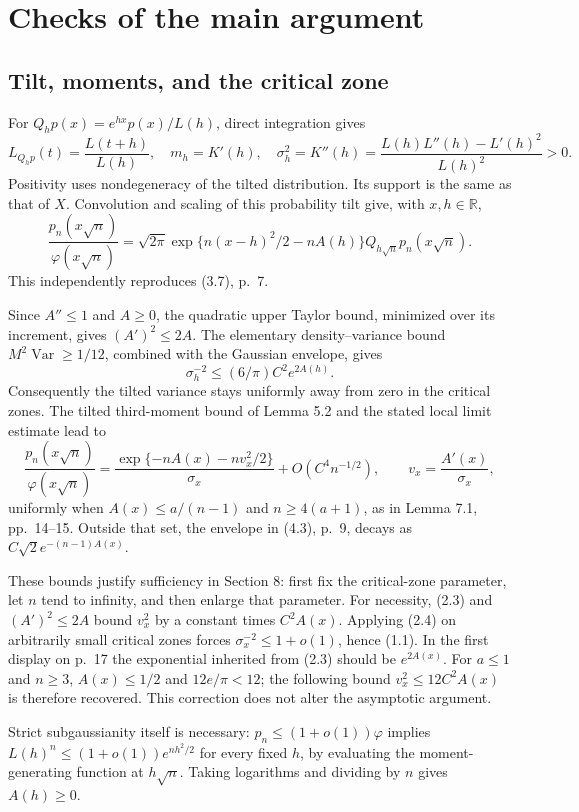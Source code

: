 \documentclass[10pt]{article}
\begin{document}
\section*{Checks of the main argument}
\subsection*{Tilt, moments, and the critical zone}
For \(Q_hp(x)=e^{hx}p(x)/L(h)\), direct integration gives \[L_{Q_hp}(t)=\frac{L(t+h)}{L(h)},\quad
 m_h=K'(h),\quad
 \sigma_h^2=K''(h)=\frac{L(h)L''(h)-L'(h)^2}{L(h)^2}>0.       \tag{2.1}\] Positivity uses nondegeneracy of the tilted distribution. Its support is the same as that of \(X\). Convolution and scaling of this probability tilt give, with \(x,h\in\mathbb R\), \[\frac{p_n(x\sqrt n)}{\varphi(x\sqrt n)}
 =\sqrt{2\pi}\exp\{n(x-h)^2/2-nA(h)\}
     Q_{h\sqrt n}p_n(x\sqrt n).                            \tag{2.2}\] This independently reproduces (3.7), p. 7.\par
Since \(A''\le1\) and \(A\ge0\), the quadratic upper Taylor bound, minimized over its increment, gives \((A')^2\le2A\). The elementary density–variance bound \(M^2\operatorname{Var}\ge1/12\), combined with the Gaussian envelope, gives \[\sigma_h^{-2}\le(6/\pi)C^2e^{2A(h)}.                       \tag{2.3}\] Consequently the tilted variance stays uniformly away from zero in the critical zones. The tilted third-moment bound of Lemma 5.2 and the stated local limit estimate lead to \[\frac{p_n(x\sqrt n)}{\varphi(x\sqrt n)}
 =\frac{\exp\{-nA(x)-nv_x^2/2\}}{\sigma_x}
       +O(C^4n^{-1/2}),\qquad v_x=\frac{A'(x)}{\sigma_x},   \tag{2.4}\] uniformly when \(A(x)\le a/(n-1)\) and \(n\ge4(a+1)\), as in Lemma 7.1, pp. 14–15. Outside that set, the envelope in (4.3), p. 9, decays as \(C\sqrt2e^{-(n-1)A(x)}\).\par
These bounds justify sufficiency in Section 8: first fix the critical-zone parameter, let \(n\) tend to infinity, and then enlarge that parameter. For necessity, (2.3) and \((A')^2\le2A\) bound \(v_x^2\) by a constant times \(C^2A(x)\). Applying (2.4) on arbitrarily small critical zones forces \(\sigma_x^{-2}\le1+o(1)\), hence (1.1). In the first display on p. 17 the exponential inherited from (2.3) should be \(e^{2A(x)}\). For \(a\le1\) and \(n\ge3\), \(A(x)\le1/2\) and \(12e/\pi<12\); the following bound \(v_x^2\le12C^2A(x)\) is therefore recovered. This correction does not alter the asymptotic argument.\par
Strict subgaussianity itself is necessary: \(p_n\le(1+o(1))\varphi\) implies \(L(h)^n\le(1+o(1))e^{nh^2/2}\) for every fixed \(h\), by evaluating the moment-generating function at \(h\sqrt n\). Taking logarithms and dividing by \(n\) gives \(A(h)\ge0\).\par
\end{document}
